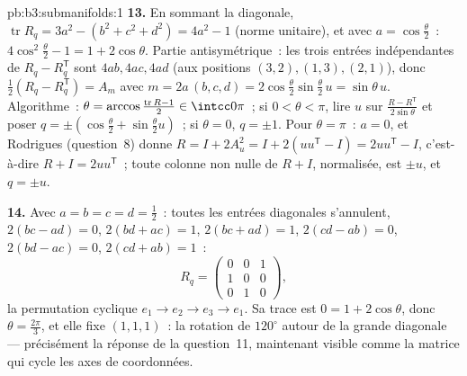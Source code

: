\begin{solution}{pb:b3:submanifolds:1}
\textbf{13.} En sommant la diagonale, $\operatorname{tr}R_q
= 3a^2 - (b^2 + c^2 + d^2) = 4a^2 - 1$ (norme unitaire), et
avec $a = \cos\frac\theta2$~: $4\cos^2\frac\theta2 - 1 = 1 +
2\cos\theta$. Partie antisymétrique~: les trois entrées
indépendantes de $R_q - R_q^{\mathsf T}$ sont $4ab, 4ac,
4ad$ (aux positions $(3,2), (1,3), (2,1)$), donc
$\frac12(R_q - R_q^{\mathsf T}) = A_m$ avec $m =
2a\,(b, c, d) = 2\cos\frac\theta2\sin\frac\theta2\,u =
\sin\theta\,u$. Algorithme~: $\theta =
\arccos\frac{\operatorname{tr}R - 1}{2} \in \intcc0\pi$~;
si $0 < \theta < \pi$, lire $u$ sur $\frac{R - R^{\mathsf
T}}{2\sin\theta}$ et poser $q = \pm(\cos\frac\theta2 +
\sin\frac\theta2 u)$~; si $\theta = 0$, $q = \pm1$. Pour
$\theta = \pi$~: $a = 0$, et Rodrigues (question~8) donne
$R = I + 2A_u^2 = I + 2(uu^{\mathsf T} - I) =
2uu^{\mathsf T} - I$, c'est-à-dire $R + I = 2uu^{\mathsf
T}$~; toute colonne non nulle de $R + I$, normalisée, est
$\pm u$, et $q = \pm u$.

\textbf{14.} Avec $a = b = c = d = \frac12$~: toutes les
entrées diagonales s'annulent, $2(bc - ad) = 0$, $2(bd +
ac) = 1$, $2(bc + ad) = 1$, $2(cd - ab) = 0$, $2(bd - ac) =
0$, $2(cd + ab) = 1$~:
\[
R_q = \begin{pmatrix} 0 & 0 & 1\\ 1 & 0 & 0\\ 0 & 1 & 0
\end{pmatrix},
\]
la permutation cyclique $e_1 \to e_2 \to e_3 \to e_1$. Sa
trace est $0 = 1 + 2\cos\theta$, donc $\theta =
\frac{2\pi}3$, et elle fixe $(1,1,1)$~: la rotation de
$120^\circ$ autour de la grande diagonale --- précisément
la réponse de la question~11, maintenant visible comme la
matrice qui cycle les axes de coordonnées.


\end{solution}
